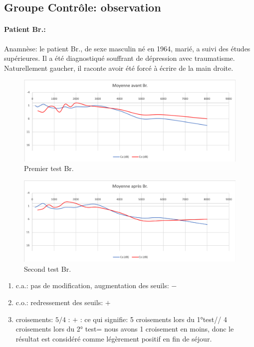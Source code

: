  \subsection*{Groupe Contrôle: observation}
  \paragraph{ Patient Br.:}
  Anamnèse: le patient Br., de sexe masculin né en 1964, marié, a suivi des études supérieures. Il a été 
  diagnostiqué souffrant de dépression avec 
  traumatisme.  Naturellement gaucher, il raconte avoir été forcé à écrire de la main droite.
  
  \begin{figure}[ht]
\centering
\includegraphics[width=1\linewidth]{images/graphiques/bru_pre.png}
\caption[  \textbf{Groupe Contrôle}: Patient Br.. 1° test]{Premier test Br.}
\end{figure}



 \begin{figure}[th]
\centering
\includegraphics[width=1\linewidth]{images/graphiques/bru_post.png}
\caption[Patient Br. :  2° test]{Second test Br.}

\end{figure}

	\begin{enumerate}
 		\item  c.a.: pas de modification, augmentation des
                  seuils: $-$
 		\item  c.o.: redressement des seuils: $+$
 		\item  croisements: $5/4$ : $+$ : ce qui signifie:  5 croisements lors du 1°test// 4 croisements lors du 
 		2° test= nous avons 1 croisement en moins, donc le résultat est considéré comme légèrement 
 		positif en fin
                  de séjour.
                \end{enumerate}

